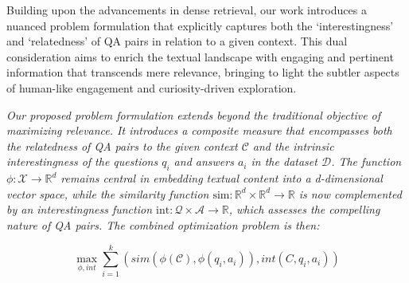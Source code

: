\documentclass[11pt]{article}
\begin{document}
Building upon the advancements in dense retrieval, our work introduces a nuanced problem formulation that explicitly captures both the `interestingness' and `relatedness' of QA pairs in relation to a given context. This dual consideration aims to enrich the textual landscape with engaging and pertinent information that transcends mere relevance, bringing to light the subtler aspects of human-like engagement and curiosity-driven exploration.


\textit{Our proposed problem formulation extends beyond the traditional objective of maximizing relevance. It introduces a composite measure that encompasses both the relatedness of QA pairs to the given context \( \mathcal{C} \) and the intrinsic interestingness of the questions \( q_i \) and answers \( a_i \) in the dataset \( \mathcal{D} \). The function \( \phi: \mathcal{X} \rightarrow \mathbb{R}^d \) remains central in embedding textual content into a d-dimensional vector space, while the similarity function \( \text{sim}: \mathbb{R}^d \times \mathbb{R}^d \rightarrow \mathbb{R} \) is now complemented by an interestingness function \( \text{int}: \mathcal{Q} \times \mathcal{A} \rightarrow \mathbb{R} \), which assesses the compelling nature of QA pairs. The combined optimization problem is then:}


\begin{equation}
\label{eq_interest_relatedness}
\max_{\phi, int} \sum_{i=1}^{k} ( sim(\phi(\mathcal{C}), \phi(q_i, a_i)), int(C, q_i, a_i ))
\end{equation}


\end{document}
